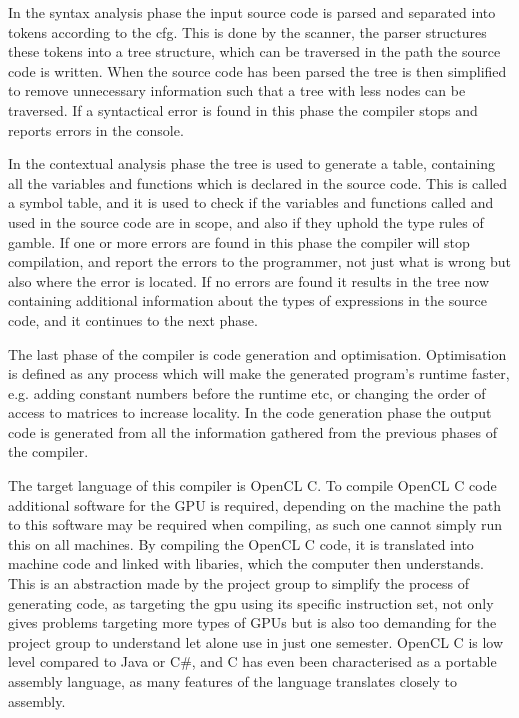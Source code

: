 In the syntax analysis phase the input source code is parsed and separated into tokens according to the \acrshort{cfg}.
This is done by the scanner, the parser structures these tokens into a tree structure, which can be traversed in the path the source code is written.
When the source code has been parsed the tree is then simplified to remove unnecessary information such that a tree with less nodes can be traversed.
If a syntactical error is found in this phase the compiler stops and reports errors in the console.

In the contextual analysis phase the tree is used to generate a table, containing all the variables and functions which is declared in the source code.
This is called a symbol table, and it is used to check if the variables and functions called and used in the source code are in scope, and also if they uphold the type rules of \gls{gamble}.
If one or more errors are found in this phase the compiler will stop compilation, and report the errors to the programmer, not just what is wrong but also where the error is located.
If no errors are found it results in the tree now containing additional information about the types of expressions in the source code, and it continues to the next phase.

The last phase of the compiler is code generation and optimisation.
Optimisation is defined as any process which will make the generated program's runtime faster, e.g. adding constant numbers before the runtime etc, or changing the order of access to matrices to increase locality. 
In the code generation phase the output code is generated from all the information gathered from the previous phases of the compiler.

The target language of this compiler is OpenCL C.
To compile OpenCL C code additional software for the GPU is required, depending on the machine the path to this software may be required when compiling, as such one cannot simply run this on all machines.
By compiling the OpenCL C code, it is translated into machine code and linked with libaries, which the computer then understands.
This is an abstraction made by the project group to simplify the process of generating code, as targeting the \acrshort{gpu} using its specific instruction set, not only gives problems targeting more types of GPUs but is also too demanding for the project group to understand let alone use in just one semester.
OpenCL C is low level compared to Java or C\#, and C has even been characterised as a portable assembly language, as many features of the language translates closely to assembly. \citep{CPort}

